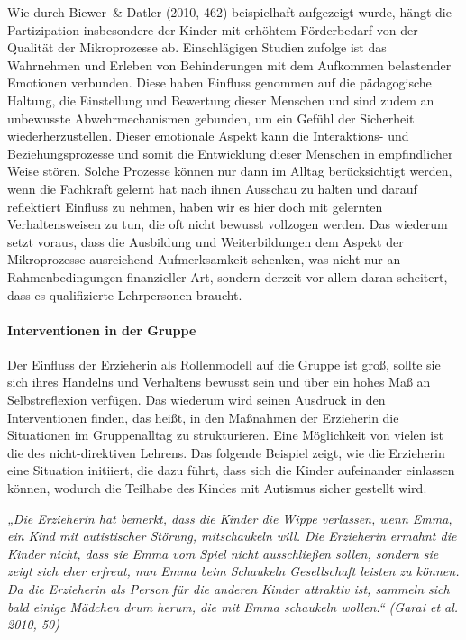 Wie durch Biewer~\& Datler (2010, 462) beispielhaft aufgezeigt wurde, hängt die Partizipation insbesondere der Kinder mit erhöhtem Förderbedarf von der Qualität der Mikroprozesse ab. Einschlägigen Studien zufolge ist das Wahrnehmen und Erleben von Behinderungen mit dem Aufkommen belastender Emotionen verbunden. Diese haben Einfluss genommen auf die pädagogische Haltung, die Einstellung und Bewertung dieser Menschen und sind zudem an unbewusste Abwehrmechanismen gebunden, um ein Gefühl der Sicherheit wiederherzustellen. Dieser emotionale Aspekt kann die Interaktions- und Beziehungsprozesse und somit die Entwicklung dieser Menschen in empfindlicher Weise stören. Solche Prozesse können nur dann im Alltag berücksichtigt werden, wenn die Fachkraft gelernt hat nach ihnen Ausschau zu halten und darauf reflektiert Einfluss zu nehmen, haben wir es hier doch mit gelernten Verhaltensweisen zu tun, die oft nicht bewusst vollzogen werden. Das wiederum setzt voraus, dass die Ausbildung und Weiterbildungen dem Aspekt der Mikroprozesse ausreichend Aufmerksamkeit schenken, was nicht nur an Rahmenbedingungen finanzieller Art, sondern derzeit vor allem daran scheitert, dass es qualifizierte Lehrpersonen braucht.  
    
\paragraph{Interventionen in der Gruppe}
Der Einfluss der Erzieherin als Rollenmodell auf die Gruppe ist groß, sollte sie sich ihres Handelns und Verhaltens bewusst sein und über ein hohes Maß an Selbstreflexion verfügen. Das wiederum wird seinen Ausdruck in den Interventionen finden, das heißt, in den Maßnahmen der Erzieherin die Situationen im Gruppenalltag zu strukturieren. Eine Möglichkeit von vielen ist die des nicht-direktiven Lehrens. Das folgende Beispiel zeigt, wie die Erzieherin eine Situation initiiert, die dazu führt, dass sich die Kinder aufeinander einlassen können, wodurch die Teilhabe des Kindes mit Autismus sicher gestellt wird. 

\emph{„Die Erzieherin hat bemerkt, dass die Kinder die Wippe verlassen, wenn Emma, ein Kind mit autistischer Störung, mitschaukeln will. Die Erzieherin ermahnt die Kinder nicht, dass sie Emma vom Spiel nicht ausschließen sollen, sondern sie zeigt sich eher erfreut, nun Emma beim Schaukeln Gesellschaft leisten zu können. Da die Erzieherin als Person für die anderen Kinder attraktiv ist, sammeln sich bald einige Mädchen drum herum, die mit Emma schaukeln wollen.“ (Garai et al. 2010, 50)}

